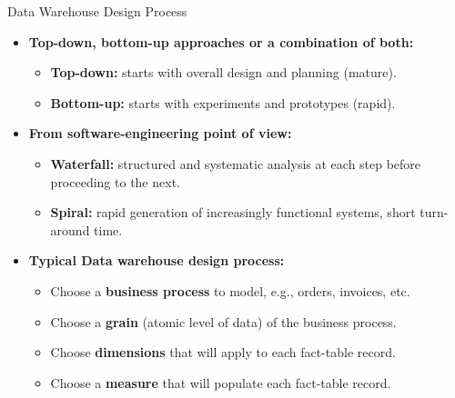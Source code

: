 \begin{frame}{Data Warehouse Design Process}
  \begin{itemize}
  \item \textbf{Top-down, bottom-up approaches or a combination of both:}
    \begin{itemize}
    \item \textbf{\color{airforceblue}Top-down:} starts with overall design and planning (mature).
    \item \textbf{\color{airforceblue}Bottom-up:} starts with experiments and prototypes (rapid).
    \end{itemize}
  \item \textbf{From software-engineering point of view:}
    \begin{itemize}
    \item \textbf{\color{airforceblue}Waterfall:} structured and systematic analysis at each step before proceeding to the next.
    \item \textbf{\color{airforceblue}Spiral:} rapid generation of increasingly functional systems, short turn-around time.
    \end{itemize}
  \item \textbf{Typical Data warehouse design process:}
    \begin{itemize}
    \item Choose a \textbf{\color{airforceblue}business process} to model, e.g., orders, invoices, etc.
    \item Choose a \textbf{\color{airforceblue}grain} (atomic level of data) of the business process.
    \item Choose \textbf{\color{airforceblue}dimensions} that will apply to each fact-table record.
    \item Choose a \textbf{\color{airforceblue}measure} that will populate each fact-table record.
    \end{itemize}
  \end{itemize}
\end{frame}

